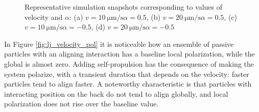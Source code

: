 \documentclass[../../master_thesis_np.tex]{subfiles}
\begin{document}
\begin{figure}[hbtp]
			\caption{Representative simulation snapshots corresponding to values of velocity and $\alpha$: (a) $v = \SI{10}{\um \per \second} \alpha = 0.5$, (b) $v = \SI{20}{\um \per \second} \alpha = 0.5$, (c) $v = \SI{10}{\um \per \second} \alpha = -0.5$, (d) $v = \SI{20}{\um \per \second} \alpha = -0.5$}
			\label{fig:lj_velocity_situa}
		\end{figure}
		
		In Figure \ref{fig:lj_velocity_pol} it is noticeable how an ensemble of passive particles with an aligning interaction has a baseline local polarization, while the global is almost zero. 
		Adding self-propulsion has the consequence of making the system polarize, with a transient duration that depends on the velocity: faster particles tend to align faster. 
		A noteworthy characteristic is that particles with interacting position on the back do not tend to align globally, and local polarization does not rise over the baseline value.
		
\end{document}
